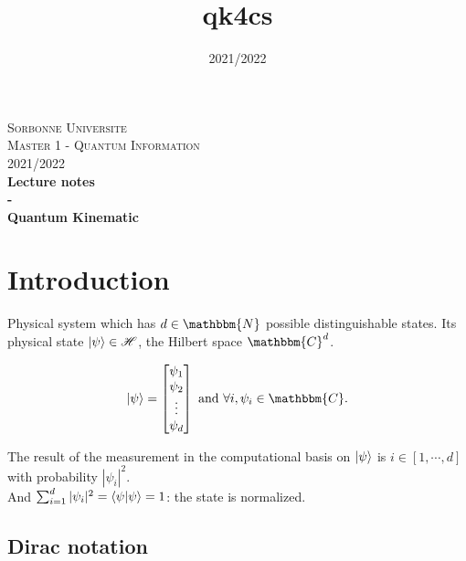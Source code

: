\documentclass{article}
\title{qk4cs}
\author{}
\date{2021/2022}
\begin{document}
\begin{titlepage}
\begin{center}

\textsc{\LARGE Sorbonne Universite} \\[1cm]
\textsc{\LARGE Master 1 - Quantum Information} \\[1cm]
\textsc{\Large 2021/2022} \\[7cm]


{\huge \bfseries Lecture notes} \\[0.5cm]
{\huge \bfseries -} \\[0.5cm]
{\huge \bfseries Quantum Kinematic} \\[4cm]
\vfill
\end{center}
\end{titlepage}

\tableofcontents

\newpage

\section{Introduction}
Physical system which has $d \in \mathbbm{N}$ possible distinguishable states.
Its physical state $\ket{\psi} \in \mathscr{H}$, the Hilbert space $\mathbbm{C}^d$.

\begin{equation}
    \ket{\psi} = \begin{bmatrix} \psi_1\\ \psi_2 \\ \vdots \\ \psi_d\end{bmatrix}
    \text{ and } \forall i, \psi_i \in \mathbbm{C}.
\end{equation}


\noindent
The result of the measurement in the computational basis on
$\ket{\psi}$
 is $i \in [1, \cdots, d]$ with probability $|\psi_i|^2$.
 \\ \noindent
And $\sum_{i=1}^d |\psi_i|^2 = \braket{\psi|\psi} = 1$: the state is normalized.

\subsection{Dirac notation}
\end{document}
